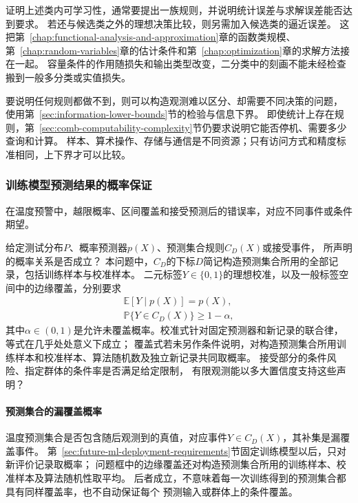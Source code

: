 证明上述类内可学习性，通常要提出一族规则，并说明统计误差与求解误差能否达到要求。
若还与候选类之外的理想决策比较，则另需加入候选类的逼近误差。
这把第~\ref{chap:functional-analysis-and-approximation}章的函数类规模、
第~\ref{chap:random-variables}章的估计条件和第~\ref{chap:optimization}章的求解方法接在一起。
容量条件的作用随损失和输出类型改变，二分类中的刻画不能未经检查搬到一般多分类或实值损失。

要说明任何规则都做不到，则可以构造观测难以区分、却需要不同决策的问题，
使用第~\ref{sec:information-lower-bounds}节的检验与信息下界。
即使统计上存在规则，第~\ref{sec:comb-computability-complexity}节仍要求说明它能否停机、需要多少查询和计算。
样本、算术操作、存储与通信是不同资源；只有访问方式和精度标准相同，上下界才可以比较。

\subsubsection{训练模型预测结果的概率保证}
\label{sec:future-analysis-reliability}

在温度预警中，越限概率、区间覆盖和接受预测后的错误率，对应不同事件或条件期望。

\begin{mathproblem}[预测与决策的概率关系是否满足要求]
  \label{question:future-reliability}
  给定测试分布$P$、概率预测器$p(X)$、预测集合规则$C_D(X)$或接受事件，
  所声明的概率关系是否成立？
  本问题中，$C_D$的下标$D$简记构造预测集合所用的全部记录，包括训练样本与校准样本。
  二元标签$Y\in\{0,1\}$的理想校准，以及一般标签空间中的边缘覆盖，分别要求
  \[
    \begin{gathered}
      \mathbb E[Y\mid p(X)]=p(X),\\
      \mathbb P\{Y\in C_D(X)\}\geq1-\alpha,
    \end{gathered}
  \]
  其中$\alpha\in(0,1)$是允许未覆盖概率。校准式针对固定预测器和新记录的联合律，等式在几乎处处意义下成立；
  覆盖式若未另作条件说明，对构造预测集合所用训练样本和校准样本、算法随机数及独立新记录共同取概率。
  接受部分的条件风险、指定群体的条件率是否满足给定限制，
  有限观测能以多大置信度支持这些声明？
\end{mathproblem}

\paragraph{预测集合的漏覆盖概率}

温度预测集合是否包含随后观测到的真值，对应事件$Y\in C_D(X)$，其补集是漏覆盖事件。
第~\ref{sec:future-ml-deployment-requirements}节固定训练模型以后，只对新评价记录取概率；
问题框中的边缘覆盖还对构造预测集合所用的训练样本、校准样本及算法随机性取平均。
后者成立，不意味着每一次训练得到的预测集合都具有同样覆盖率，也不自动保证每个
预测输入或群体上的条件覆盖。

